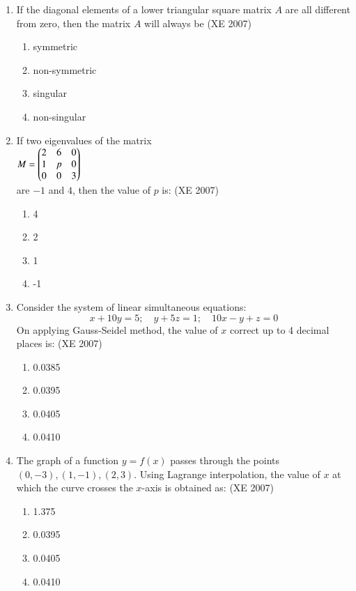 \documentclass[journal,12pt,onecolumn]{IEEEtran}
\theoremstyle{remark}
\begin{document}
\begin{enumerate}
    \item If the diagonal elements of a lower triangular square matrix $A$ are all different from zero, then the matrix $A$ will always be
    \hfill{(XE 2007)}
    \begin{multicols}{4}
    \begin{enumerate}
        \item symmetric
        \item non-symmetric
        \item singular
        \item non-singular
    \end{enumerate}
\end{multicols}
    \item If two eigenvalues of the matrix\\ $M = \begin{pmatrix} 2 & 6 & 0 \\ 1 & p & 0 \\ 0 & 0 & 3\end{pmatrix}$\\ are $-1$ and $4$, then the value of $p$ is:
  \hfill{(XE 2007)}
    \begin{multicols}{4}
    \begin{enumerate}
        \item 4
        \item 2
        \item 1
        \item -1
    \end{enumerate}
\end{multicols}
    \item Consider the system of linear simultaneous equations:
    \[
    x + 10y = 5;\quad y + 5z = 1; \quad 10x - y + z = 0
    \]
    On applying Gauss-Seidel method, the value of $x$ correct up to 4 decimal places is:
  \hfill{(XE 2007)}
    \begin{multicols}{4}
    \begin{enumerate}
        \item 0.0385
        \item 0.0395
        \item 0.0405
        \item 0.0410
    \end{enumerate}
\end{multicols}
    \item The graph of a function $y = f(x)$ passes through the points $(0, -3), (1, -1), (2, 3)$. Using Lagrange interpolation, the value of $x$ at which the curve crosses the $x$-axis is obtained as:
  \hfill{(XE 2007)}
    \begin{multicols}{4}
    \begin{enumerate}
    \item 1.375
    \item 0.0395
    \item 0.0405
    \item 0.0410
    \end{enumerate}
 \end{multicols}
 

\end{enumerate}
\end{document}

